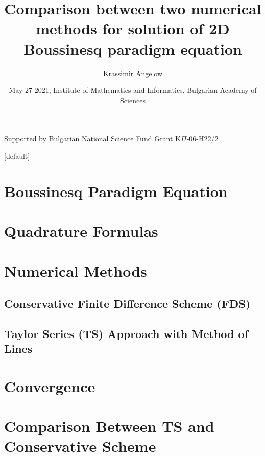 \documentclass{beamer}
\begin{document}
\title{Comparison between two numerical methods for solution of 2D Boussinesq paradigm equation}

\author[K. Angelow]{{\underline{Krassimir Angelow}} }
\date[2021]{May 27  2021,  Institute of Mathematics and Informatics, Bulgarian Academy of Sciences}


\begin{frame}
 \titlepage
 \begin{center}
  Supported by Bulgarian National Science Fund Grant K$\Pi$-06-H22/2
  \end{center}
\end{frame}

\begin{frame}
\tableofcontents 
{}[default]
\section{Boussinesq Paradigm Equation}
\section{Quadrature Formulas}
\section{Numerical Methods}
\subsection{Conservative Finite Difference Scheme (FDS) }
\subsection{Taylor Series (TS) Approach with Method of Lines }
\section{Convergence}

\section{Comparison Between TS and Conservative Scheme}
\end{frame}
\end{document}

